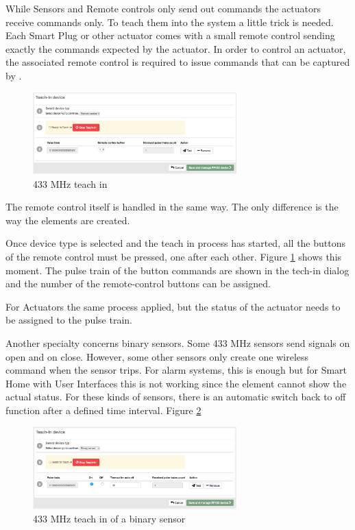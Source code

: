 While Sensors and Remote controls only send out commands the actuators receive commands 
only. To teach them into the system a little trick is needed. Each Smart Plug or other 
actuator comes with a small remote control sending exactly the commands expected by the 
actuator. In order to control an actuator, the associated remote control is required to 
issue commands that can be captured by \zway.

\begin{figure}
\begin{center}
\includegraphics[width=0.7\textwidth]{pngs/cap9/433_13.png}
\caption{433 MHz teach in}
\label{433_13}
\end{center}
\end{figure}

The remote control itself is handled in the same way. The only difference is the way the 
elements are created.

Once device type is selected and the teach in process has started, all the buttons of the 
remote control must be pressed, one after each other. Figure \ref{433_13} shows this moment.
The pulse train of the button commands are shown in the tech-in dialog and the number of 
the remote-control buttons can be assigned.

For Actuators the same process applied, but the status of the actuator needs to be 
assigned to the pulse train.

Another specialty concerns binary sensors. Some 433 MHz sensors send signals on open and on 
close. However, some other sensors only create one wireless command when the sensor 
trips. For alarm systems, this is enough but for Smart Home with User Interfaces this 
is not working since the element cannot show the actual status. For these kinds of 
sensors, there is an automatic switch back to off function after a defined time 
interval. Figure \ref{433_12}

\begin{figure}
\begin{center}
\includegraphics[width=0.7\textwidth]{pngs/cap9/433_12.png}
\caption{433 MHz teach in of a binary sensor}
\label{433_12}
\end{center}
\end{figure}

